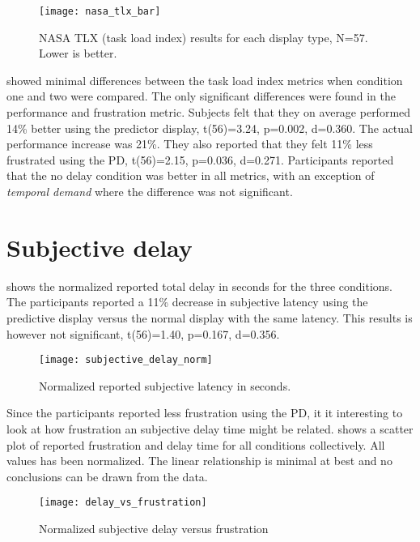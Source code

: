 \begin{figure}[h!]
    \centering
    \texttt{[image: nasa\_tlx\_bar]}
    \caption{NASA TLX (task load index) results for each display type, N=57. Lower is better.}
    \label{tlx}
\end{figure}




 showed minimal differences between the task load index metrics when condition one and two were compared. The only significant differences were found in the performance and frustration metric. Subjects felt that they on average performed 14\% better using the predictor display, t(56)=3.24, p=0.002, d=0.360. The actual performance increase was 21\%. They also reported that they felt 11\% less frustrated using the PD, t(56)=2.15, p=0.036, d=0.271. Participants reported that the no delay condition was better in all metrics, with an exception of \emph{temporal demand} where the difference was not significant.


\section{Subjective delay}

 shows the normalized reported total delay in seconds for the three conditions. The participants reported a 11\% decrease in subjective latency using the predictive display versus the normal display with the same latency. This results is however not significant, t(56)=1.40, p=0.167, d=0.356.

\begin{figure}[h!]
    \centering
    \texttt{[image: subjective\_delay\_norm]}
    \caption{Normalized reported subjective latency in seconds.}
    \label{subjective_delay_norm}
\end{figure}

Since the participants reported less frustration using the PD, it it interesting to look at how frustration an subjective delay time might be related.  shows a scatter plot of reported frustration and delay time for all conditions collectively. All values has been normalized. The linear relationship is minimal at best and no conclusions can be drawn from the data.

\begin{figure}[h!]
    \centering
    \texttt{[image: delay\_vs\_frustration]}
    \caption{Normalized subjective delay versus frustration}
    \label{delay_vs_frustration}
\end{figure}

